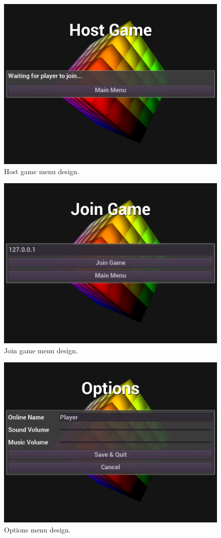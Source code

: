 \documentclass[12pt]{article}
\begin{document}
    \begin{figure}[H]
        \centering
        \includegraphics[width=4.5in]{Anttris_HGMenu.png}
        \caption{Host game menu design.}
    \end{figure}
    \begin{figure}[H]
        \centering
        \includegraphics[width=4.5in]{Anttris_JGMenu.png}
        \caption{Join game menu design.}
    \end{figure}
    \begin{figure}[H]
        \centering
        \includegraphics[width=4.5in]{Anttris_OptionsMenu.png}
        \caption{Options menu design.}
    \end{figure}
\end{document}
